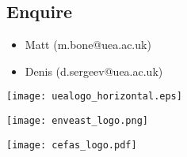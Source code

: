 \documentclass[paper=a4]{scrartcl}
\newcommand*{\pyitem}{\item [{\texttt{[image: python\_logo.png]}}]}
\begin{document}
\subsection*{Enquire}
\small
\begin{itemize}
\pyitem Matt (m.bone@uea.ac.uk)
\pyitem Denis (d.sergeev@uea.ac.uk)
\end{itemize}



\begin{center}
\begin{minipage}{0.2\linewidth}
    \texttt{[image: uealogo\_horizontal.eps]}
\end{minipage}
\hspace{2cm}
\begin{minipage}{0.2\linewidth}
    \texttt{[image: enveast\_logo.png]}
\end{minipage}
\hspace{2cm}
\begin{minipage}{0.2\linewidth}
    \texttt{[image: cefas\_logo.pdf]}
\end{minipage}
\end{center}
\end{document}
